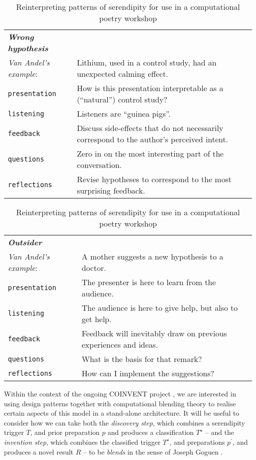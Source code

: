 \begin{table}[p]
\begin{tabular}{lp{}}
{\bf\emph{Wrong hypothesis}} & \\
\emph{Van Andel's example}: & Lithium, used in a control study, had an unexpected calming effect. \\[.2cm]
{\tt presentation}& How is this presentation interpretable as a (``natural'') control study? \\
{\tt listening} & Listeners are ``guinea pigs''.\\
{\tt feedback} & Discuss side-effects that do not necessarily correspond to the author's perceived intent. \\
{\tt questions} & Zero in on the most interesting part of the conversation.\\
{\tt reflections} & Revise hypotheses to correspond to the most surprising feedback. \\
\end{tabular}
\bigskip

\begin{tabular}{lp{}}
{\bf\emph{Outsider}} & \\
\emph{Van Andel's example}: & A mother suggests a new hypothesis to a doctor. \\[.2cm]
{\tt presentation}& The presenter is here to learn from the audience. \\
{\tt listening} & The audience is here to give help, but also to get help.\\
{\tt feedback} & Feedback will inevitably draw on previous experiences and ideas.\\
{\tt questions} & What is the basis for that remark?\\
{\tt reflections} & How can I implement the suggestions?\\
\end{tabular}

\caption{Reinterpreting patterns of serendipity for use in a computational poetry workshop\label{tab:reinterpret}}
\end{table}

Within the context of the ongoing COINVENT project \cite{coinvent14},
we are interested in using design patterns together with computational
blending theory to realise certain aspects of this model in a
stand-alone architecture.
%
It will be useful to consider how we can take both the \emph{discovery
  step}, which combines a serendipity trigger $T$, and prior
preparation $p$ and produces a classification $T^{\star}$ -- and the
\emph{invention step}, which combines the classified trigger
$T^{\star}$, and preparations $p^{\prime}$, and produces a novel
result $R$ -- to be \emph{blends} in the sense of Joseph Goguen
\citeyear{goguen1999introduction}.  

